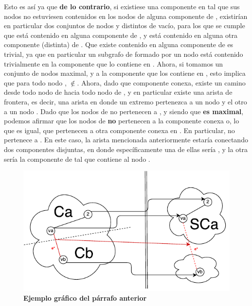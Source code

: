 \documentclass[11pt, a4paper, twoside]{article}
\begin{document}
\begin{paragraph}
\begin{demostracion}
Esto es así ya que \textbf{de lo contrario}, si existiese una componente
 en  tal que sus nodos no estuviesen
contenidos en los nodos de alguna componente de , existirían
en particular dos conjuntos de nodos  y
 distintos de vacío, para los que se
cumple que  está contenido en alguna componente de
, y  está contenido en alguna otra componente
(distinta) de . Que existe  contenido en
alguna componente de  es trivial, ya que en particular un
subgrafo de  formado por un nodo está contenido trivialmente
en la componente que lo contiene en . Ahora, si tomamos
 un conjunto de nodos maximal, y  a la
componente que los contiene en , esto implica que para todo
nodo ,
$\notin$. Ahora, dado que  componente conexa, existe un camino desde todo nodo de
 hacia todo nodo de , y en particular existe
una arista de frontera, es decir, una arista 
en donde un extremo pertenezca a un nodo  y el otro
a un nodo . Dado que los nodos de 
no pertenecen a , y siendo que  \textbf{es
maximal}, podemos afirmar que los nodos de  \textbf{no}
pertenecen a la componente conexa  o, lo que es igual, que
pertenecen a otra componente conexa en . En particular,
 no pertenece a . En este caso, la arista
 mencionada anteriormente estaría conectando dos componentes
disjuntas, en donde específicamente una de ellas sería ,
y la otra sería la componente de  tal que contiene
al nodo .

\begin{figure}[H]
   \begin{center}
   \includegraphics[width=1\textwidth]{diagrama_ej2.pdf}
   \caption{\textbf{Ejemplo gráfico del párrafo anterior}}
   \label{fig:ej2-1}
   \end{center}
\end{figure}


\end{demostracion}
\end{paragraph}
\end{document}
